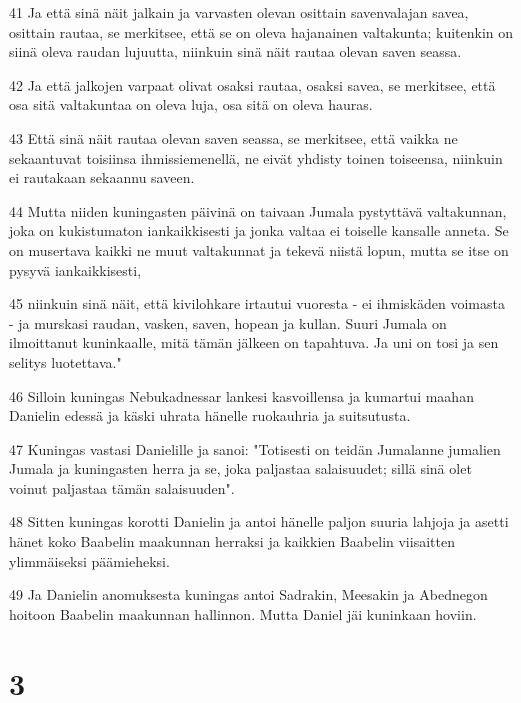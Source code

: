 \par 41 Ja että sinä näit jalkain ja varvasten olevan osittain savenvalajan savea, osittain rautaa, se merkitsee, että se on oleva hajanainen valtakunta; kuitenkin on siinä oleva raudan lujuutta, niinkuin sinä näit rautaa olevan saven seassa.
\par 42 Ja että jalkojen varpaat olivat osaksi rautaa, osaksi savea, se merkitsee, että osa sitä valtakuntaa on oleva luja, osa sitä on oleva hauras.
\par 43 Että sinä näit rautaa olevan saven seassa, se merkitsee, että vaikka ne sekaantuvat toisiinsa ihmissiemenellä, ne eivät yhdisty toinen toiseensa, niinkuin ei rautakaan sekaannu saveen.
\par 44 Mutta niiden kuningasten päivinä on taivaan Jumala pystyttävä valtakunnan, joka on kukistumaton iankaikkisesti ja jonka valtaa ei toiselle kansalle anneta. Se on musertava kaikki ne muut valtakunnat ja tekevä niistä lopun, mutta se itse on pysyvä iankaikkisesti,
\par 45 niinkuin sinä näit, että kivilohkare irtautui vuoresta - ei ihmiskäden voimasta - ja murskasi raudan, vasken, saven, hopean ja kullan. Suuri Jumala on ilmoittanut kuninkaalle, mitä tämän jälkeen on tapahtuva. Ja uni on tosi ja sen selitys luotettava."
\par 46 Silloin kuningas Nebukadnessar lankesi kasvoillensa ja kumartui maahan Danielin edessä ja käski uhrata hänelle ruokauhria ja suitsutusta.
\par 47 Kuningas vastasi Danielille ja sanoi: "Totisesti on teidän Jumalanne jumalien Jumala ja kuningasten herra ja se, joka paljastaa salaisuudet; sillä sinä olet voinut paljastaa tämän salaisuuden".
\par 48 Sitten kuningas korotti Danielin ja antoi hänelle paljon suuria lahjoja ja asetti hänet koko Baabelin maakunnan herraksi ja kaikkien Baabelin viisaitten ylimmäiseksi päämieheksi.
\par 49 Ja Danielin anomuksesta kuningas antoi Sadrakin, Meesakin ja Abednegon hoitoon Baabelin maakunnan hallinnon. Mutta Daniel jäi kuninkaan hoviin.

\chapter{3}

